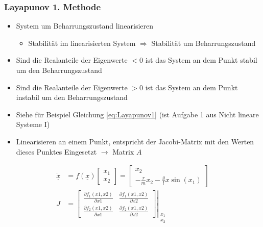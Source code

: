 \subsubsection{Layapunov 1. Methode}
\begin{itemize}
	\item System um Beharrungszustand linearisieren
	\begin{itemize}
		\item Stabilität im linearisierten System $\Rightarrow$ Stabilität um Beharrungszustand
	\end{itemize} 
	\item Sind die Realanteile der Eigenwerte  $< 0$ ist das System an dem Punkt stabil um den Beharrungszustand
	\item Sind die Realanteile der Eigenwerte  $> 0$ ist das System an dem Punkt instabil um den Beharrungszustand
	\item Siehe für Beispiel Gleichung \ref{eq:Layapunov1} (ist Aufgabe 1 aus \glqq Nicht lineare Systeme I\grqq)
	\item Linearisieren an einem Punkt, entspricht der Jacobi-Matrix mit den Werten dieses Punktes Eingesetzt $\rightarrow$ Matrix $A$
\end{itemize}
\begin{align}
	\label{eq:Layapunov1}
	\dot{\underline{x}} &= f(\underline{x})
	\begin{bmatrix}
		x_1\\
		x_2
	\end{bmatrix} = \begin{bmatrix}
		x_2\\
		-\frac{r}{m}x_2-\frac{g}{l}x\sin(x_1)
	\end{bmatrix}\\
	J &= \left.\begin{bmatrix}
		\frac{\partial f_1(x1,x2)}{\partial x1}	& \frac{\partial f_1(x1,x2)}{\partial x2}\\
		\frac{\partial f_2(x1,x2)}{\partial x1} &\frac{\partial f_2(x1,x2)}{\partial x2}
	\end{bmatrix}\right\lvert_{\begin{matrix}
		x_1\\x_2
	\end{matrix}}
\end{align}

